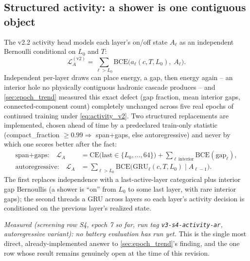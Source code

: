\documentclass[10pt,a4paper]{article}
\begin{document}
\subsection{Structured activity: a shower is one contiguous object}
\label{sec:activity_head}
The v2.2 activity head models each layer's on/off state $A_\ell$ as an independent Bernoulli conditional on $L_0$ and $T$:
\begin{equation}
\mathcal{L}_A^{(\mathrm{v2})} = \sum_{\ell > L_0} \mathrm{BCE}\big(a_\ell(c, T, L_0),\; A_\ell\big).
\label{eq:activity_v2}
\end{equation}
Independent per-layer draws can place energy, a gap, then energy again -- an interior hole no physically contiguous hadronic cascade produces -- and \cref{sec:epoch_trend} measured this exact defect (gap fraction, mean interior gaps, connected-component count) completely unchanged across five real epochs of continued training under \cref{eq:activity_v2}. Two structured replacements are implemented, chosen ahead of time by a predeclared train-only statistic (compact\_fraction $\ge 0.99 \Rightarrow$ span+gaps, else autoregressive) and never by which one scores better after the fact:
\begin{align}
\text{span+gaps:} \quad \mathcal{L}_A &= \mathrm{CE}\big(\mathrm{last} \in \{L_0,\ldots,64\}\big) + \sum_{\ell\,\mathrm{interior}} \mathrm{BCE}(\mathrm{gap}_\ell), \label{eq:activity_spangaps}\\
\text{autoregressive:} \quad \mathcal{L}_A &= \sum_{\ell > L_0} \mathrm{BCE}\big(\mathrm{GRU}_\ell(c, T, L_0) \mid A_{\ell-1}\big). \label{eq:activity_ar}
\end{align}
The first replaces independence with a last-active-layer categorical plus interior gap Bernoullis (a shower is ``on'' from $L_0$ to some last layer, with rare interior gaps); the second threads a GRU across layers so each layer's activity decision is conditioned on the previous layer's realized state.

\emph{Measured (screening row S4, epoch 7 so far, run tag \texttt{v3-s4-activity-ar}, autoregressive variant): no battery evaluation has run yet.} This is the single most direct, already-implemented answer to \cref{sec:epoch_trend}'s finding, and the one row whose result remains genuinely open at the time of this revision.
\end{document}
